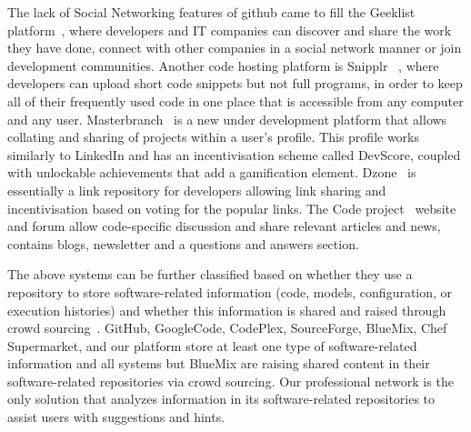 The lack of Social Networking features of github came to fill the Geeklist platform~\cite{geeklist_url}, where developers and IT companies can discover and share the work they have done, connect with other companies in a social network manner or join development communities. Another code hosting platform is Snipplr ~\cite{snipplr_url}, where developers can upload short code snippets but not full programs, in order to keep all of their frequently used code in one place that is accessible from any computer and any user. Masterbranch~\cite{masterbranch_url} is a new under development platform that allows collating and sharing of projects within a user's profile. This profile works similarly to LinkedIn and has an incentivisation scheme called DevScore, coupled with unlockable achievements that add a gamification element. Dzone~\cite{dzone_url} is essentially a link repository for developers allowing link sharing and incentivisation based on voting for the popular links. The Code project~\cite{codeproject_url} website and forum allow code-specific discussion and share relevant articles and news, contains blogs, newsletter and a questions and answers section.

The above systems can be further classified based on whether they use a repository to store software-related information (code, models, configuration, or execution histories) and whether this information is shared and raised through crowd sourcing~\cite{	howe2006rise}.  GitHub, GoogleCode, CodePlex, SourceForge, BlueMix, Chef Supermarket, and our platform store at least one type of software-related information and all systems but BlueMix are raising shared content in their software-related repositories via crowd sourcing. Our professional network is the only solution that analyzes information in its software-related repositories to assist users with suggestions and hints. 

